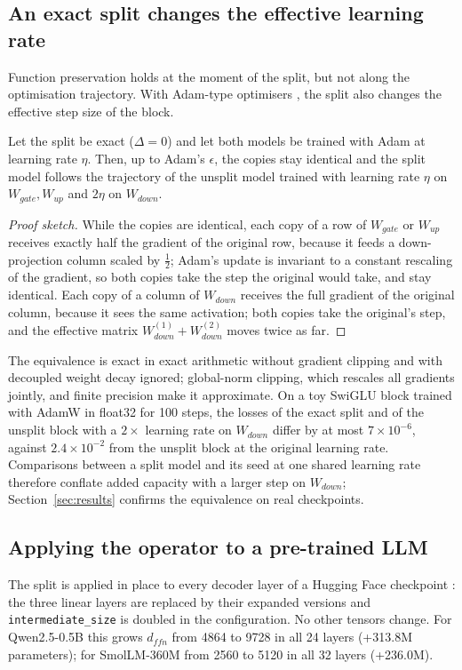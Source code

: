 \subsection{An exact split changes the effective learning rate}
\label{sec:lr_equiv}
Function preservation holds at the moment of the split, but not along the optimisation trajectory. With Adam-type optimisers \citep{kingma2015adam,loshchilov2019adamw}, the split also changes the effective step size of the block.
\begin{proposition}
\label{prop:lr}
Let the split be exact ($\Delta=0$) and let both models be trained with Adam at learning rate $\eta$. Then, up to Adam's $\epsilon$, the copies stay identical and the split model follows the trajectory of the unsplit model trained with learning rate $\eta$ on $W_{gate},W_{up}$ and $2\eta$ on $W_{down}$.
\end{proposition}
\begin{proof}[Proof sketch]
While the copies are identical, each copy of a row of $W_{gate}$ or $W_{up}$ receives exactly half the gradient of the original row, because it feeds a down-projection column scaled by $\tfrac{1}{2}$; Adam's update is invariant to a constant rescaling of the gradient, so both copies take the step the original would take, and stay identical. Each copy of a column of $W_{down}$ receives the full gradient of the original column, because it sees the same activation; both copies take the original's step, and the effective matrix $W^{(1)}_{down}+W^{(2)}_{down}$ moves twice as far.
\end{proof}
The equivalence is exact in exact arithmetic without gradient clipping and with decoupled weight decay ignored; global-norm clipping, which rescales all gradients jointly, and finite precision make it approximate. On a toy SwiGLU block trained with AdamW in float32 for 100 steps, the losses of the exact split and of the unsplit block with a $2\times$ learning rate on $W_{down}$ differ by at most $7\times10^{-6}$, against $2.4\times10^{-2}$ from the unsplit block at the original learning rate. Comparisons between a split model and its seed at one shared learning rate therefore conflate added capacity with a larger step on $W_{down}$; Section~\ref{sec:results} confirms the equivalence on real checkpoints.

\subsection{Applying the operator to a pre-trained LLM}
The split is applied in place to every decoder layer of a Hugging Face checkpoint \citep{wolf2020transformers}: the three linear layers are replaced by their expanded versions and \texttt{intermediate\_size} is doubled in the configuration. No other tensors change. For Qwen2.5-0.5B this grows $d_{ffn}$ from 4864 to 9728 in all 24 layers (+313.8M parameters); for SmolLM-360M from 2560 to 5120 in all 32 layers (+236.0M).

